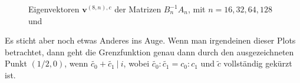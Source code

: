 \begin{figure}[H]
  \centering
  \hspace{0mm}
  \hspace{0mm}
  \caption{Eigenvektoren $\mathbf{v}^{(8, n), c}$ der Matrizen $B_n^{-1} A_n$, mit $n = 16, 32, 64, 128$ und}
  \label{fig:Eigenvektoren_general_vertauscht}
\end{figure}

Es sticht aber noch etwas Anderes ins Auge. Wenn man irgendeinen dieser Plots betrachtet, dann geht die Grenzfunktion genau dann durch den ausgezeichneten Punkt $(1/2, 0)$, wenn $\tilde{c_0} + \tilde{c_1} \: | \: i$, wobei $\tilde{c_0} : \tilde{c_1} = c_0 : c_1$ und $\tilde{c}$ vollständig gekürzt ist. \\

